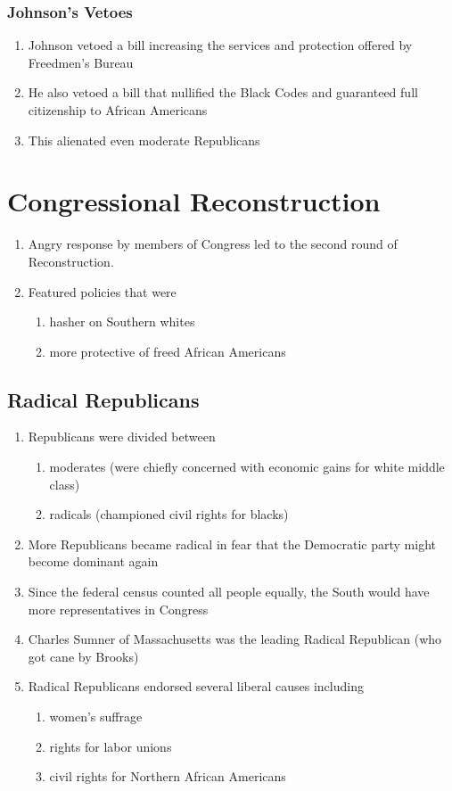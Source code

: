 \documentclass[12pt]{article} %
\begin{document}
\subsubsection{Johnson's Vetoes}
\begin{enumerate}
	\item Johnson vetoed a bill increasing the services and protection offered by Freedmen's Bureau
	\item He also vetoed a bill that nullified the Black Codes and guaranteed full citizenship to 
		African Americans
	\item This alienated even moderate Republicans 
\end{enumerate}

\section{Congressional Reconstruction}
\begin{enumerate}
	\item Angry response by members of Congress led to the second round of Reconstruction.
	\item Featured policies that were
	\begin{enumerate}
		\item hasher on Southern whites
		\item more protective of freed African Americans
	\end{enumerate}
\end{enumerate}

\subsection{Radical Republicans}
\begin{enumerate}
	\item Republicans were divided between
	\begin{enumerate}
		\item moderates (were chiefly concerned with economic gains for white middle class)
		\item radicals (championed civil rights for blacks)
	\end{enumerate}
	\item More Republicans became radical in fear that the Democratic party might become dominant
		again
	\item Since the federal census counted all people equally, the South would have more 
		representatives in Congress
	\item Charles Sumner of Massachusetts was the leading Radical Republican (who got cane by Brooks)
	\item Radical Republicans endorsed several liberal causes including
	\begin{enumerate}
		\item women's suffrage
		\item rights for labor unions
		\item civil rights for Northern African Americans
	\end{enumerate}
\end{enumerate}

\end{document}
